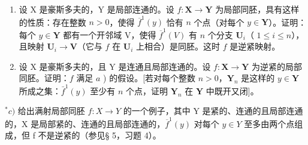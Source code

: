 \begin{enumerate}
\def\labelenumi{\alph{enumi})}
\item
  设 X 是豪斯多夫的，Y 是局部连通的。设 \(f: \mathbf{X} \to \mathbf{Y}\) 为局部同胚，具有这样的性质：存在整数 \(n > 0\)，使得 \(\overline{f}^1(y)\) 恰有 \(n\) 个点（对每个 \(y \in \mathbf{Y}\)）。证明：每个 \(y \in \mathbf{Y}\) 都有一个开邻域 V，使得 \(\overline{f}^1(V)\) 有 \(n\) 个分支 \(\mathbf{U}_i\)（ \(1 \leqslant i \leqslant n\)），且映射 \(\mathbf{U}_i \to \mathbf{V}\)（它与 \(f\) 在 \(\mathbf{U}_i\) 上相合）是同胚。这时 \(f\) 是逆紧映射。
\item
  设 X 是豪斯多夫的，且 Y 是连通且局部连通的。设 \(f: \mathbf{X} \to \mathbf{Y}\) 为逆紧的局部同胚。证明：\(f\) 满足 \(a\) ) 的假设。{[}若对每个整数 \(n > 0\)，\(\mathbf{Y}_n\) 是这样的 \(y \in \mathbf{Y}\) 所成之集：\(\bar{f}^1(y)\) 至少有 \(n\) 个点，证明 \(\mathbf{Y}_n\) 在 \(\mathbf{Y}\) 中既开又闭{]}。
\end{enumerate}

\(^{*}c)\) 给出满射局部同胚 \(f: X \to Y\) 的一个例子，其中 Y 是紧的、连通的且局部连通的，X 是局部紧的、连通的且局部连通的，\(\overline{f}^{1}(y)\) 对每个 \(y \in Y\) 至多由两个点组成，但 f 不是逆紧的（参见§ 5，习题 4）。
\relax{}
